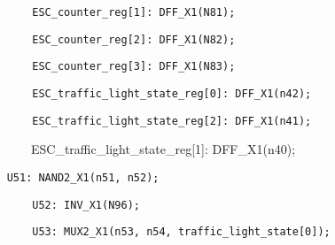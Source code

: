 \documentclass[a4paper]{article}
\begin{document}
\begin{center}
\begin{minipage}{6.07292in}
{\color[rgb]{0.0,0.0,0.039215688}
\texttt{\ \ \ \ \ \ \ \ ESC\_counter\_reg[1]: DFF\_X1(N81);}}

{\color[rgb]{0.0,0.0,0.039215688}
\texttt{\ \ \ \ \ \ \ \ ESC\_counter\_reg[2]: DFF\_X1(N82);}}

{\color[rgb]{0.0,0.0,0.039215688}
\texttt{\ \ \ \ \ \ \ \ ESC\_counter\_reg[3]: DFF\_X1(N83);}}

{\color[rgb]{0.0,0.0,0.039215688}
\texttt{\ \ \ \ \ \ \ \ ESC\_traffic\_light\_state\_reg[0]:
DFF\_X1(n42);}}

{\color[rgb]{0.0,0.0,0.039215688}
\texttt{\ \ \ \ \ \ \ \ ESC\_traffic\_light\_state\_reg[2]:
DFF\_X1(n41);}}

{\ttfamily\color[rgb]{0.0,0.0,0.039215688}
\ \ \ \ \ \ \ \ ESC\_traffic\_light\_state\_reg[1]: DFF\_X1(n40);}

{\color[rgb]{0.0,0.0,0.039215688}
\texttt{\ \ \ }\texttt{\ }\texttt{U51: NAND2\_X1(n51, n52);}}

{\color[rgb]{0.0,0.0,0.039215688}
\texttt{\ \ \ \ \ \ \ \ }\texttt{U52: INV\_X1(N96);}}

{\color[rgb]{0.0,0.0,0.039215688}
\texttt{\ \ \ \ \ \ \ \ U53: MUX2\_X1(n53, n54,
traffic\_light\_state[0]);}}


\bigskip


\bigskip


\bigskip
\end{minipage}
\end{center}

\bigskip


\bigskip


\bigskip


\bigskip


\bigskip


\bigskip


\bigskip


\bigskip


\bigskip


\bigskip


\bigskip


\bigskip


\bigskip


\bigskip


\bigskip


\bigskip


\bigskip


\bigskip


\bigskip


\bigskip


\bigskip
\end{document}
